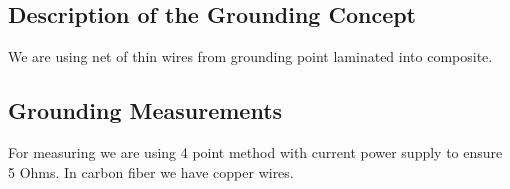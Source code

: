 \subsection{Description of the Grounding Concept}
We are using net of thin wires from grounding point laminated into composite.
\subsection{Grounding Measurements}
For measuring we are using 4 point method with current power supply to ensure 5 Ohms. In carbon fiber we have copper wires.
